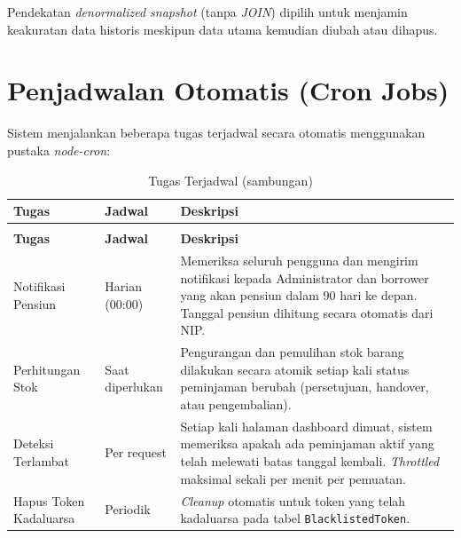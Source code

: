 \documentclass[
  12pt,
  a4paper,
  oneside,
  final
]{report}
\begin{document}
Pendekatan {\it denormalized snapshot} (tanpa {\it JOIN})
dipilih untuk menjamin keakuratan data historis meskipun
data utama kemudian diubah atau dihapus.

\chapter{Penjadwalan Otomatis (Cron Jobs)}


Sistem menjalankan beberapa tugas terjadwal secara otomatis
menggunakan pustaka {\it node-cron}:

\begin{longtable}[!htbp]{p{4cm} p{3cm} p{5.5cm}}
  \caption{Tugas Terjadwal}
  \label{tab:cron-jobs} \\
  \toprule
  \textbf{Tugas} & \textbf{Jadwal} & \textbf{Deskripsi} \\
  \midrule
  \endfirsthead
  \caption[]{Tugas Terjadwal (sambungan)} \\
  \toprule
  \textbf{Tugas} & \textbf{Jadwal} & \textbf{Deskripsi} \\
  \midrule
  \endhead
  \bottomrule
  \endfoot

  Notifikasi Pensiun       & Harian (00:00) & Memeriksa seluruh
                            pengguna dan mengirim notifikasi kepada
                            Administrator dan borrower yang akan
                            pensiun dalam 90 hari ke depan. Tanggal
                            pensiun dihitung secara otomatis dari NIP.
                            \\[6pt]
  Perhitungan Stok        & Saat diperlukan & Pengurangan dan
                            pemulihan stok barang dilakukan secara
                            atomik setiap kali status peminjaman
                            berubah (persetujuan, handover, atau
                            pengembalian). \\[6pt]
  Deteksi Terlambat        & Per request    & Setiap kali halaman
                            dashboard dimuat, sistem memeriksa
                            apakah ada peminjaman aktif yang telah
                            melewati batas tanggal kembali.
                            {\it Throttled} maksimal sekali per menit
                            per pemuatan. \\[6pt]
  Hapus Token Kadaluarsa   & Periodik        & {\it Cleanup} otomatis
                            untuk token yang telah kadaluarsa
                            pada tabel \texttt{BlacklistedToken}. \\
\end{longtable}
\end{document}
